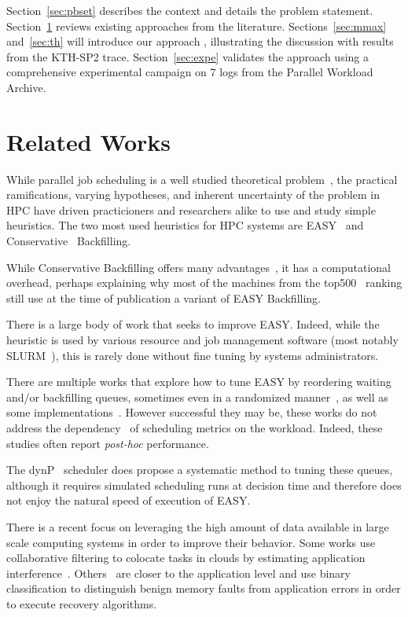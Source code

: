 Section~\ref{sec:pbset} describes the context and details the problem
statement. Section~\ref{sec:rw} reviews existing approaches from the
literature. Sections~\ref{sec:mmax} and~\ref{sec:th} will introduce our
approach , illustrating the discussion with results from the KTH-SP2 trace.
Section~\ref{sec:expe} validates the approach using a comprehensive
experimental campaign on 7 logs from the Parallel Workload
Archive\cite{Feitelson20142967}.

\section{Related Works}
\label{sec:rw}

While parallel job scheduling is a well studied theoretical
problem~\cite{leung2004handbook}, the practical ramifications, varying
hypotheses, and inherent uncertainty of the problem in HPC have driven
practicioners and researchers alike to use and study simple heuristics.
The two most used heuristics for HPC systems are EASY~\cite{easy} and
Conservative~\cite{Mu'alem:2001:UPW:380314.380315} Backfilling.

While Conservative Backfilling offers many
advantages~\cite{srinivasan2002characterization}, it has a computational
overhead, perhaps explaining why most of the machines from the
top500~\cite{top500} ranking still use at the time of publication a variant of
EASY Backfilling.

There is a large body of work that seeks to improve EASY. Indeed, while the
heuristic is used by various resource and job management software (most notably
SLURM~\cite{SLURMdocSCHED}), this is rarely done without fine tuning by systems
administrators.

There are multiple works that explore how to tune EASY by reordering waiting
and/or backfilling queues\cite{Tsafrir_easypp_2005}, sometimes even in a
randomized manner~\cite{1592720}, as well as some
implementations~\cite{Jackson2001}. However successful they may be, these works
do not address the dependency~\cite{variability} of scheduling metrics on the
workload. Indeed, these studies often report \textit{post-hoc} performance.

The dynP~\cite{streit_selftuning_2002} scheduler does propose a systematic
method to tuning these queues, although it requires simulated scheduling runs
at decision time and therefore does not enjoy the natural speed of execution
of EASY.

There is a recent focus on leveraging the high amount of data available in
large scale computing systems in order to improve their behavior. Some works
use collaborative filtering to colocate tasks in clouds by estimating
application interference~\cite{7516031}. Others~\cite{fmodeling} are closer to
the application level and use binary classification to distinguish benign
memory faults from application errors in order to execute recovery algorithms.

